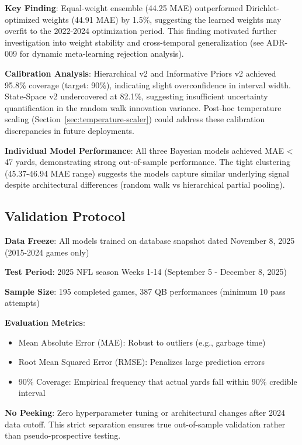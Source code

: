 \textbf{Key Finding}: Equal-weight ensemble (44.25 MAE) outperformed Dirichlet-optimized weights (44.91 MAE) by 1.5\%, suggesting the learned weights may overfit to the 2022-2024 optimization period. This finding motivated further investigation into weight stability and cross-temporal generalization (see ADR-009 for dynamic meta-learning rejection analysis).

\textbf{Calibration Analysis}: Hierarchical v2 and Informative Priors v2 achieved 95.8\% coverage (target: 90\%), indicating slight overconfidence in interval width. State-Space v2 undercovered at 82.1\%, suggesting insufficient uncertainty quantification in the random walk innovation variance. Post-hoc temperature scaling (Section~\ref{sec:temperature-scaler}) could address these calibration discrepancies in future deployments.

\textbf{Individual Model Performance}: All three Bayesian models achieved MAE < 47 yards, demonstrating strong out-of-sample performance. The tight clustering (45.37-46.94 MAE range) suggests the models capture similar underlying signal despite architectural differences (random walk vs hierarchical partial pooling).

\subsection{Validation Protocol}

\textbf{Data Freeze}: All models trained on database snapshot dated November 8, 2025 (2015-2024 games only)

\textbf{Test Period}: 2025 NFL season Weeks 1-14 (September 5 - December 8, 2025)

\textbf{Sample Size}: 195 completed games, 387 QB performances (minimum 10 pass attempts)

\textbf{Evaluation Metrics}:
\begin{itemize}
\item Mean Absolute Error (MAE): Robust to outliers (e.g., garbage time)
\item Root Mean Squared Error (RMSE): Penalizes large prediction errors
\item 90\% Coverage: Empirical frequency that actual yards fall within 90\% credible interval
\end{itemize}

\textbf{No Peeking}: Zero hyperparameter tuning or architectural changes after 2024 data cutoff. This strict separation ensures true out-of-sample validation rather than pseudo-prospective testing.

